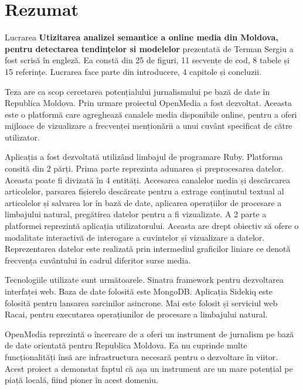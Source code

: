 \section*{Rezumat}
Lucrarea \textbf{Utizitarea analizei semantice a online media din Moldova, pentru detectarea tendințelor si modelelor} prezentată de Terman Sergiu a fost scrisă în engleză. Ea constă din 25 de figuri, 11 secvențe de cod, 8 tabele și 15 referințe. Lucrarea face parte din introducere, 4 capitole și concluzii.

Teza are ca scop cercetarea potențialului jurnalismului pe bază de date în Republica Moldova. Prin urmare proiectul OpenMedia a fost dezvoltat. Aceasta este o platformă care agreghează canalele media disponibile online, pentru a oferi mijloace de vizualizare a frecvenței menționării a unui cuvânt specificat de către utilizator.

Aplicația a fost dezvoltată utilizând limbajul de programare Ruby. Platforma consită din 2 părți. Prima parte reprezinta adunarea și preprocesarea datelor. Aceasta poate fi divizată în 4 entități. Accesarea canalelor media și descărcarea articolelor, parsarea fișierelo descărcate pentru a extrage conținutul textual al articolelor și salvarea lor în bază de date, aplicarea operațiilor de procesare a limbajului natural, pregătirea datelor pentru a fi vizualizate. A 2 parte a platformei reprezintă aplicația utilizatorului. Aceasta are drept obiectiv să ofere o modalitate interactivă de interogare a cuvintelor și vizualizare a datelor. Reprezentarea datelor este realizată prin intermediul graficilor liniare ce denotă frecvența cuvântului în cadrul diferitor surse media.

Tecnologiile utilizate sunt următoarele. Sinatra framework pentru dezvoltarea interfaței web. Baza de date folosită este MongoDB. Aplicația Sidekiq este folosită pentru lansarea sarcinilor asincrone. Mai este folosit și serviciul web Racai, pentru executarea operațiunilor de procesare a limbajului natural.


OpenMedia reprezintă o încercare de a oferi un instrument de jurnalism pe bază de date orientată pentru Republica Moldova. Ea nu cuprinde multe funcționalități însă are infrastructura necesară pentru o dezvoltare în viitor. Acest proiect a demonstat faptul că așa un instrument are un mare potențial pe piață locală, fiind pioner în acest domeniu.
